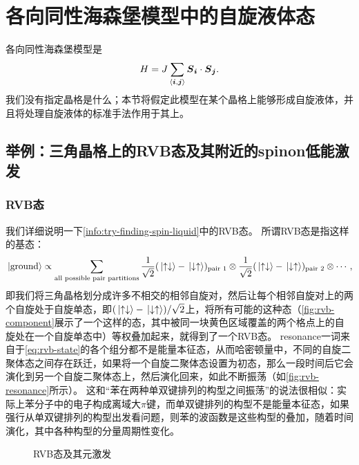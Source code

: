 \section{各向同性海森堡模型中的自旋液体态}

各向同性海森堡模型是
\begin{equation}
    H = J \sum_{\langle \vb*{i}, \vb*{j} \rangle} \vb*{S}_{\vb*{i}} \cdot \vb*{S}_{\vb*{j}}.
    \label{eq:heisenberg-model-spin-liquid}
\end{equation}
我们没有指定晶格是什么；本节将假定此模型在某个晶格上能够形成自旋液体，并且将处理自旋液体的标准手法作用于其上。

\subsection{举例：三角晶格上的RVB态及其附近的spinon低能激发}

\subsubsection{RVB态}

我们详细说明一下\autoref{info:try-finding-spin-liquid}中的RVB态。
所谓RVB态是指这样的基态：
\begin{equation}
    \ket*{\text{ground}} \propto \sum_{\text{all possible pair partitions}} \frac{1}{\sqrt{2}} (\ket*{\uparrow \downarrow} - \ket*{\downarrow \uparrow})_{\text{pair 1}} \otimes \frac{1}{\sqrt{2}} (\ket*{\uparrow \downarrow} - \ket*{\downarrow \uparrow})_{\text{pair 2}} \otimes \cdots, 
    \label{eq:rvb-state}
\end{equation}
即我们将三角晶格划分成许多不相交的相邻自旋对，然后让每个相邻自旋对上的两个自旋处于自旋单态，即$(\ket*{\uparrow \downarrow} - \ket*{\downarrow \uparrow}) / \sqrt{2}$上，将所有可能的这种态（\autoref{fig:rvb-component}展示了一个这样的态，其中被同一块黄色区域覆盖的两个格点上的自旋处在一个自旋单态中）等权叠加起来，就得到了一个RVB态。
resonance一词来自于\eqref{eq:rvb-state}的各个组分都不是能量本征态，从而哈密顿量中，不同的自旋二聚体态之间存在跃迁，如果将一个自旋二聚体态设置为初态，那么一段时间后它会演化到另一个自旋二聚体态上，然后演化回来，如此不断振荡（如\autoref{fig:rvb-resonance}所示）。
这和“苯在两种单双键排列的构型之间振荡”的说法很相似：实际上苯分子中的电子构成离域大$\pi$键，而单双键排列的构型不是能量本征态，如果强行从单双键排列的构型出发看问题，则苯的波函数是这些构型的叠加，随着时间演化，其中各种构型的分量周期性变化。

\begin{figure}
    \centering
    \subfigure[RVB态中的一个成分]{
        
        \label{fig:rvb-component}
    }
    \caption{RVB态及其元激发}
\end{figure}

